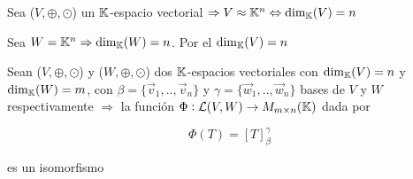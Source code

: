 \begin{corollary}
    Sea ($V, \oplus, \odot$) un $\mathbb{K}$-espacio vectorial $\Rightarrow  V \approx \mathbb{K}^n \Leftrightarrow {\dim}_{\mathbb{K}}(V) = n $
\end{corollary}

\begin{orangeproof}
    Sea $W = \mathbb{K}^n \Rightarrow {\dim}_{\mathbb{K}}(W) = n$. Por el  ${\dim}_{\mathbb{K}}(V) = n$
\end{orangeproof}

\begin{theorem} \label{theom2223}
    Sean ($V, \oplus, \odot$) y ($W, \oplus, \odot$) dos $\mathbb{K}$-espacios vectoriales con $ {\dim}_{\mathbb{K}}(V) = n$ y $ {\dim}_{\mathbb{K}}(W) = m$, con $\beta = \{ \vec{v}_{1}, .., \vec{v}_{n} \}$ y $\gamma = \{ \vec{w}_{1}, .., \vec{w}_{n} \}$ bases de $V$ y $W$ respectivamente $\Rightarrow$ la función $\Phi : \mathcal{L}(V,W) \to M_{m \times n} (\mathbb{K})$ dada por 

    $$\Phi(T) = {[T]}_{\beta}^{\gamma}$$

    es un isomorfismo
\end{theorem}

